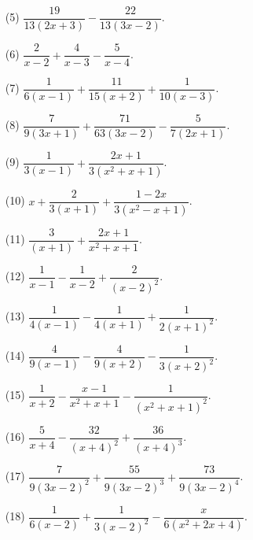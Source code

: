 \documentclass[a4paper,11pt,openany]{ltjsbook}
\begin{document}
\begin{enumerate}
\item[(5)] $\dfrac{19}{13(2x + 3)} - \dfrac{22}{13(3x - 2)}$.

\item[(6)] $\dfrac{2}{ x - 2} + \dfrac{4}{ x - 3} - \dfrac{5}{ x - 4}$.

\item[(7)] $\dfrac{1}{6(x - 1)} + \dfrac{11}{15(x + 2)} + \dfrac{1}{10(x - 3)}$.

\item[(8)] $\dfrac{7}{9(3x + 1)} + \dfrac{71}{63(3x - 2)} - \dfrac{5}{7(2x + 1)}$.

\item[(9)] $\dfrac{1}{3(x - 1)} + \dfrac{2x + 1}{3(x^2 + x + 1)}$.

\item[(10)] $x + \dfrac{2}{3(x + 1)} + \dfrac{1 - 2x}{3(x^2 - x + 1)}$.

\item[(11)] $\dfrac{3}{(x + 1)} + \dfrac{2x + 1}{x^2 + x + 1}$.

\item[(12)] $\dfrac{1}{ x - 1} - \dfrac{1}{ x - 2} + \dfrac{2}{(x - 2)^2}$.

\item[(13)] $\dfrac{1}{4(x - 1)} - \dfrac{1}{4(x + 1)} + \dfrac{1}{2(x + 1)^2}$.

\item[(14)] $\dfrac{4}{9(x - 1)} - \dfrac{4}{9(x + 2)} - \dfrac{1}{3(x + 2)^2}$.

\item[(15)] $\dfrac{1}{ x + 2} - \dfrac{x - 1}{ x^2 + x + 1} - \dfrac{1}{(x^2 + x + 1)^2}$.

\item[(16)] $\dfrac{5}{ x + 4} -\dfrac{32}{(x + 4)^2} + \dfrac{36}{(x + 4)^3}$.

\item[(17)] $\dfrac{7}{9(3x - 2)^2} + \dfrac{55}{9(3x - 2)^3} + \dfrac{73}{9(3x - 2)^4}$.

\item[(18)] $\dfrac{1}{6(x - 2)} + \dfrac{1}{3(x - 2)^2} - \dfrac{x}{6(x^2 + 2x + 4)}$.

\end{enumerate}
\par\bigskip{}\par\smallskip
\end{document}
